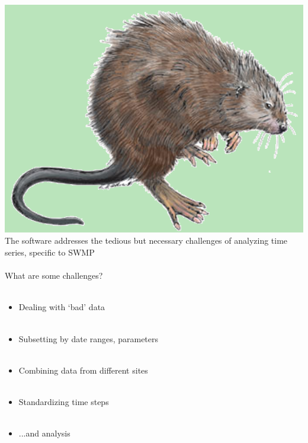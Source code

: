 \documentclass[serif]{beamer}\usepackage[]{graphicx}\usepackage[]{color}
\begin{document}
\begin{frame}[fragile]{\includegraphics[width=0.05\paperwidth]{fig/muskrat.png}\hspace{0.07in}{\bf SWMPrats.net: The SWMPr package}}
The software addresses the tedious but necessary challenges of analyzing time series, specific to SWMP \\~\\
What are some challenges? \\~\\
\begin{itemize}
\item Dealing with `bad' data \\~\\
\item Subsetting by date ranges, parameters \\~\\
\item Combining data from different sites \\~\\
\item Standardizing time steps \\~\\
\item ...and analysis
\end{itemize}
\end{frame}
\end{document}
